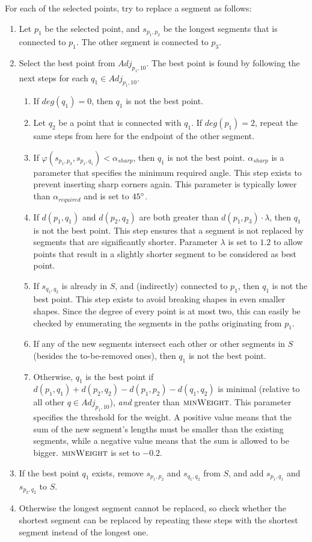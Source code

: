 \documentclass[11pt]{article}
\begin{document}
For each of the selected points, try to replace a segment as follows:

\begin{enumerate}
\item Let $p_1$ be the selected point, and $s_{p_1,p_2}$ be the longest segments that is connected to $p_1$. The other segment is connected to $p_3$.
\item Select the best point from $Adj_{p_1,10}$. The best point is found by following the next steps for each $q_1 \in Adj_{p_1,10}$.
  \begin{enumerate}
  \item If $deg(q_1) = 0$, then $q_1$ is not the best point.
  \item Let $q_2$ be a point that is connected with $q_1$. If $deg(p_1) = 2$, repeat the same steps from here for the endpoint of the other segment.
  \item If $\varphi(s_{p_1,p_3}, s_{p_1,q_1}) < \alpha_{sharp}$, then $q_1$ is not the best point. $\alpha_{sharp}$ is a parameter that specifies the minimum required angle. This step exists to prevent inserting sharp corners again. This parameter is typically lower than $\alpha_{required}$ and is set to $45\degree$.
  \item If $d(p_1, q_1)$ and $d(p_2,q_2)$ are both greater than $d(p_1,p_3) \cdot \lambda$, then $q_1$ is not the best point.
  This step ensures that a segment is not replaced by segments that are significantly shorter.
  Parameter $\lambda$ is set to $1.2$ to allow points that result in a slightly shorter segment to be considered as best point.
  \item If $s_{q_1,q_2}$ is already in $S$, and (indirectly) connected to $p_1$, then $q_1$ is not the best point. This step exists to avoid breaking shapes in even smaller shapes. Since the degree of every point is at most two, this can easily be checked by enumerating the segments in the paths originating from $p_1$.
  \item If any of the new segments intersect each other or other segments in $S$ (besides the to-be-removed ones), then $q_1$ is not the best point.
  \item Otherwise, $q_1$ is the best point if $d(p_1,q_1) + d(p_2,q_2) - d(p_1,p_2) - d(q_1,q_2)$ is minimal (relative to all other $q \in Adj_{p_1,10}$), \textit{and} greater than $\textsc{minWeight}$. This parameter specifies the threshold for the weight. A positive value means that the sum of the new segment's lengths must be smaller than the existing segments, while a negative value means that the sum is allowed to be bigger. $\textsc{minWeight}$ is set to $-0.2$.
  \end{enumerate}

\item If the best point $q_1$ exists, remove $s_{p_1,p_2}$ and $s_{q_1,q_2}$ from $S$, and add $s_{p_1,q_1}$ and $s_{p_2,q_2}$ to $S$.
\item Otherwise the longest segment cannot be replaced, so check whether the shortest segment can be replaced by repeating these steps with the shortest segment instead of the longest one.
\end{enumerate}
\end{document}
